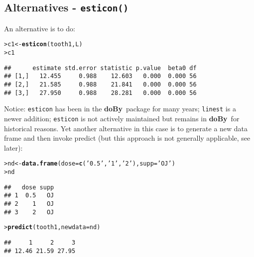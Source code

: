 \documentclass[11pt]{article}\usepackage[]{graphicx}\usepackage[]{color}
\makeatletter
\newcommand{\hlstr}[1]{\textcolor[rgb]{0.192,0.494,0.8}{#1}}%
\newcommand{\hlstd}[1]{\textcolor[rgb]{0.345,0.345,0.345}{#1}}%
\newcommand{\hlkwb}[1]{\textcolor[rgb]{0.69,0.353,0.396}{#1}}%
\newcommand{\hlkwc}[1]{\textcolor[rgb]{0.333,0.667,0.333}{#1}}%
\newcommand{\hlkwd}[1]{\textcolor[rgb]{0.737,0.353,0.396}{\textbf{#1}}}%
\newenvironment{kframe}{%
 \def\at@end@of@kframe{}%
 \ifinner\ifhmode%
  \def\at@end@of@kframe{\end{minipage}}%
  \begin{minipage}{\columnwidth}%
 \fi\fi%
 \def\FrameCommand##1{\hskip\@totalleftmargin \hskip-\fboxsep
 \colorbox{shadecolor}{##1}\hskip-\fboxsep
     \hskip-\linewidth \hskip-\@totalleftmargin \hskip\columnwidth}%
 \MakeFramed {\advance\hsize-\width
   \@totalleftmargin\z@ \linewidth\hsize
   \@setminipage}}%
 {\par\unskip\endMakeFramed%
 \at@end@of@kframe}
\newenvironment{knitrout}{}{} %
\def\pkg#1{{\bf #1}}
\def\doby{\pkg{doBy}}
\renewenvironment{knitrout}{
  \begin{oldknitrout}
    \footnotesize
    \topsep=0pt
}{
  \end{oldknitrout}
}
\makeatother
\begin{document}
\subsection{Alternatives - \texttt{esticon()}}
\label{sec:alternatives}


An alternative is to do:

\begin{knitrout}
\color{fgcolor}\begin{kframe}
\begin{alltt}
\hlstd{> }\hlstd{c1} \hlkwb{<-} \hlkwd{esticon}\hlstd{(tooth1, L)}
\hlstd{> }\hlstd{c1}
\end{alltt}
\begin{verbatim}
##      estimate std.error statistic p.value  beta0 df
## [1,]   12.455     0.988    12.603   0.000  0.000 56
## [2,]   21.585     0.988    21.841   0.000  0.000 56
## [3,]   27.950     0.988    28.281   0.000  0.000 56
\end{verbatim}
\end{kframe}
\end{knitrout}

Notice: \verb|esticon| has been in the \doby\ package for many years;
\verb|linest| is a newer addition; \verb|esticon| is not actively
maintained but remains in \doby\ for historical reasons.  Yet another
alternative in this case is to generate a new data frame and then
invoke predict (but this approach is not generally applicable, see later):

\begin{knitrout}
\color{fgcolor}\begin{kframe}
\begin{alltt}
\hlstd{> }\hlstd{nd} \hlkwb{<-} \hlkwd{data.frame}\hlstd{(}\hlkwc{dose}\hlstd{=}\hlkwd{c}\hlstd{(}\hlstr{'0.5'}\hlstd{,} \hlstr{'1'}\hlstd{,} \hlstr{'2'}\hlstd{),} \hlkwc{supp}\hlstd{=}\hlstr{'OJ'}\hlstd{)}
\hlstd{> }\hlstd{nd}
\end{alltt}
\begin{verbatim}
##   dose supp
## 1  0.5   OJ
## 2    1   OJ
## 3    2   OJ
\end{verbatim}
\begin{alltt}
\hlstd{> }\hlkwd{predict}\hlstd{(tooth1,} \hlkwc{newdata}\hlstd{=nd)}
\end{alltt}
\begin{verbatim}
##     1     2     3 
## 12.46 21.59 27.95
\end{verbatim}
\end{kframe}
\end{knitrout}
\end{document}
